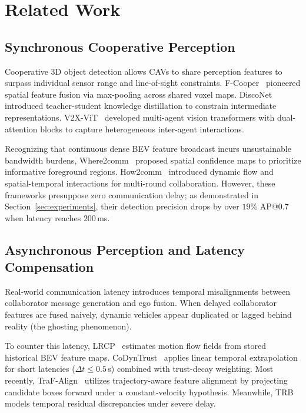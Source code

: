 \documentclass[10pt,journal,compsoc]{IEEEtran}
\begin{document}
\section{Related Work}

\subsection{Synchronous Cooperative Perception}
Cooperative 3D object detection allows CAVs to share perception features to surpass individual sensor range and line-of-sight constraints. F-Cooper~\cite{chen2019fcooper} pioneered spatial feature fusion via max-pooling across shared voxel maps. DiscoNet~\cite{li2021disconet} introduced teacher-student knowledge distillation to constrain intermediate representations. V2X-ViT~\cite{xu2022v2xvit} developed multi-agent vision transformers with dual-attention blocks to capture heterogeneous inter-agent interactions. 

Recognizing that continuous dense BEV feature broadcast incurs unsustainable bandwidth burdens, Where2comm~\cite{hu2022where2comm} proposed spatial confidence maps to prioritize informative foreground regions. How2comm~\cite{huang2023how2comm} introduced dynamic flow and spatial-temporal interactions for multi-round collaboration. However, these frameworks presuppose zero communication delay; as demonstrated in Section~\ref{sec:experiments}, their detection precision drops by over $19\%$ AP@0.7 when latency reaches $200$\,ms.

\subsection{Asynchronous Perception and Latency Compensation}
Real-world communication latency introduces temporal misalignments between collaborator message generation and ego fusion. When delayed collaborator features are fused naively, dynamic vehicles appear duplicated or lagged behind reality (the ghosting phenomenon). 

To counter this latency, LRCP~\cite{lrcp2023latency} estimates motion flow fields from stored historical BEV feature maps. CoDynTrust~\cite{codyntrust2024} applies linear temporal extrapolation for short latencies ($\Delta t \le 0.5$\,s) combined with trust-decay weighting. Most recently, TraF-Align~\cite{song2025trafalign} utilizes trajectory-aware feature alignment by projecting candidate boxes forward under a constant-velocity hypothesis. Meanwhile, TRB~\cite{trb2024temporal} models temporal residual discrepancies under severe delay. 
\end{document}
